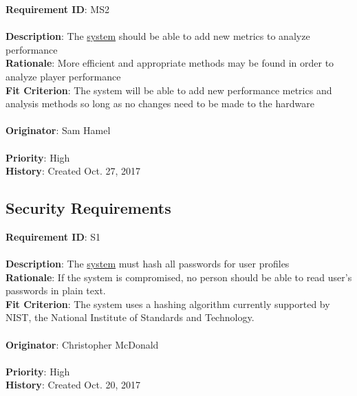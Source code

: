 \documentclass[11pt]{article}
\begin{document}
\begin{framed}
	\noindent\textbf{Requirement ID}: MS2 \\\\
	\noindent\textbf{Description}: The \hyperref[sec:definitions]{system} should be able to add new metrics to analyze performance\\
	\textbf{Rationale}: More efficient and appropriate methods may be found in order to analyze player performance\\
	\textbf{Fit Criterion}: The system will be able to add new performance metrics and analysis methods so long as no changes need to be made to the hardware\\\\
	\textbf{Originator}: Sam Hamel \\\\
	\textbf{Priority}: High \hfill \\
	\noindent\textbf{History}: Created Oct. 27, 2017
\end{framed}


\subsection{Security Requirements}
\begin{framed}
	\noindent\textbf{Requirement ID}: S1 \hfill\\\\
	\noindent\textbf{Description}: The \hyperref[sec:definitions]{system} must hash all passwords for user profiles \\
	\textbf{Rationale}: If the system is compromised, no person should be able to read user's passwords in plain text. \\
	\textbf{Fit Criterion}: The system uses a hashing algorithm currently supported by NIST, the National Institute of Standards and Technology.\\\\
	\textbf{Originator}: Christopher McDonald \\\\
	\textbf{Priority}: High \hfill \\
	\noindent\textbf{History}: Created Oct. 20, 2017
\end{framed}
\end{document}
